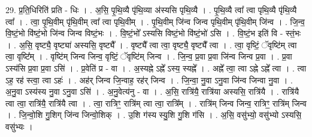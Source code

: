 \documentclass[17pt]{extarticle}
\begin{document}
29. प्र॒ति॒धिरिति॑ प्रति - धिः । . अ॒सि॒ पृ॒थि॒व्यै पृ॑थि॒व्या अ॑स्यसि पृथि॒व्यै । . पृ॒थि॒व्यै त्वा᳚ त्वा पृथि॒व्यै पृ॑थि॒व्यै त्वा᳚ । . त्वा॒ पृ॒थि॒वीम् पृ॑थि॒वीम् त्वा᳚ त्वा पृथि॒वीम् । . पृ॒थि॒वीम् जि॑न्व जिन्व पृथि॒वीम् पृ॑थि॒वीम् जि॑न्व । . जि॒न्व॒ वि॒ष्टं॒भो वि॑ष्टं॒भो जि॑न्व जिन्व विष्टं॒भः । . वि॒ष्टं॒भो᳚ ऽस्यसि विष्टं॒भो वि॑ष्टं॒भो॑ ऽसि । . वि॒ष्टं॒भ इति॑ वि - स्तं॒भः । . अ॒सि॒ वृष्ट्यै॒ वृष्ट्या॑ अस्यसि॒ वृष्ट्यै᳚ । . वृष्ट्यै᳚ त्वा त्वा॒ वृष्ट्यै॒ वृष्ट्यै᳚ त्वा । . त्वा॒ वृष्टिं॒ ॅवृष्टि॑म् त्वा त्वा॒ वृष्टि᳚म् । . वृष्टि॑म् जिन्व जिन्व॒ वृष्टिं॒ ॅवृष्टि॑म् जिन्व । . जि॒न्व॒ प्र॒वा प्र॒वा जि॑न्व जिन्व प्र॒वा । . प्र॒वा ऽस्य॑सि प्र॒वा प्र॒वा ऽसि॑ । . प्र॒वेति॑ प्र - वा । . अ॒स्यह्ने ऽह्ने᳚ ऽस्य॒ स्यह्ने᳚ । . अह्ने᳚ त्वा॒ त्वा ऽह्ने ऽह्ने᳚ त्वा । . त्वा ऽह॒ रह॑ स्त्वा॒ त्वा ऽहः॑ । . अह॑र् जिन्व जि॒न्वाह॒ रह॑र् जिन्व । . जि॒न्वा॒ नु॒वा ऽनु॒वा जि॑न्व जिन्वा नु॒वा । . अ॒नु॒वा ऽस्य॑स्य नु॒वा ऽनु॒वा ऽसि॑ । . अ॒नु॒वेत्य॑नु - वा । . अ॒सि॒ रात्रि॑यै॒ रात्रि॑या अस्यसि॒ रात्रि॑यै । . रात्रि॑यै त्वा त्वा॒ रात्रि॑यै॒ रात्रि॑यै त्वा । . त्वा॒ रात्रिꣳ॒॒ रात्रि॑म् त्वा त्वा॒ रात्रि᳚म् । . रात्रि॑म् जिन्व जिन्व॒ रात्रिꣳ॒॒ रात्रि॑म् जिन्व । . जि॒न्वो॒शि गु॒शिग् जि॑न्व जिन्वो॒शिक् । . उ॒शि ग॑स्य स्यु॒शि गु॒शि ग॑सि । . अ॒सि॒ वसु॑भ्यो॒ वसु॑भ्यो ऽस्यसि॒ वसु॑भ्यः । \newline
\end{document}
